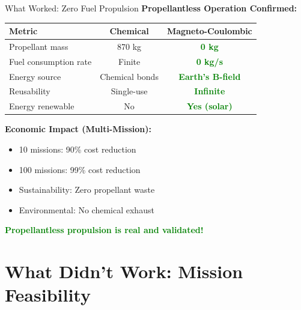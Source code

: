 \documentclass[aspectratio=169]{beamer}
\begin{document}
\begin{frame}{What Worked: Zero Fuel Propulsion}
\textbf{Propellantless Operation Confirmed:}

\vspace{0.5em}
\begin{table}
\begin{tabular}{lcc}
\toprule
\textbf{Metric} & \textbf{Chemical} & \textbf{Magneto-Coulombic} \\
\midrule
Propellant mass & 870 kg & \textcolor{green}{\textbf{0 kg}} \\
Fuel consumption rate & Finite & \textcolor{green}{\textbf{0 kg/s}} \\
Energy source & Chemical bonds & \textcolor{green}{\textbf{Earth's B-field}} \\
Reusability & Single-use & \textcolor{green}{\textbf{Infinite}} \\
Energy renewable & No & \textcolor{green}{\textbf{Yes (solar)}} \\
\bottomrule
\end{tabular}
\end{table}

\vspace{1em}
\textbf{Economic Impact (Multi-Mission):}
\begin{itemize}
    \item 10 missions: 90\% cost reduction
    \item 100 missions: 99\% cost reduction
    \item Sustainability: Zero propellant waste
    \item Environmental: No chemical exhaust
\end{itemize}

\vspace{0.5em}
\begin{center}
\textcolor{green}{\textbf{Propellantless propulsion is real and validated!}}
\end{center}
\end{frame}

\section{What Didn't Work: Mission Feasibility}
\end{document}
